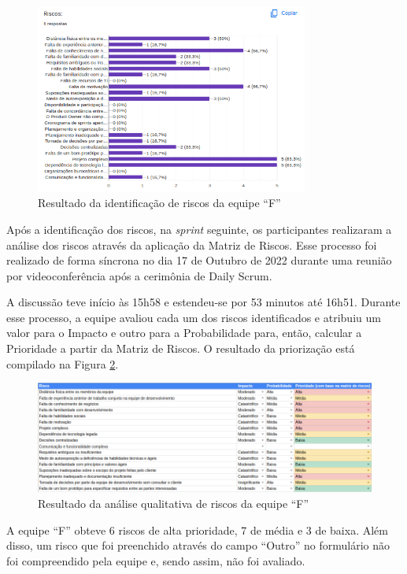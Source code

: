 \documentclass[
    12pt,       %
    openright,      %
    twoside,      %
    a4paper,      %
    english,      %
    french,       %
    spanish,      %
    brazil,       %
    ]{abntex2}
\begin{document}
\begin{figure}[H]
    \centering
    \includegraphics[width=0.8\textwidth]{src/tex/img/resultado-foundation.png}
    \caption{Resultado da identificação de riscos da equipe ``F''}
    \label{fig:result_found}
\end{figure}

Após a identificação dos riscos, na \textit{sprint} seguinte, os participantes realizaram a análise dos riscos através da aplicação da Matriz de Riscos. Esse processo foi realizado de forma síncrona no dia 17 de Outubro de 2022 durante uma reunião por videoconferência após a cerimônia de Daily Scrum. 

A discussão teve início às 15h58 e estendeu-se por 53 minutos até 16h51. Durante esse processo, a equipe avaliou cada um dos riscos identificados e atribuiu um valor para o Impacto e outro para a Probabilidade para, então, calcular a Prioridade a partir da Matriz de Riscos. O resultado da priorização está compilado na Figura \ref{fig:result_found}.

\begin{figure}[H]
    \centering
    \includegraphics[width=1\textwidth]{src/tex/img/riscos_founds.png}
    \caption{Resultado da análise qualitativa de riscos da equipe ``F''}
    \label{fig:result_found}
\end{figure}

A equipe ``F'' obteve 6 riscos de alta prioridade, 7 de média e 3 de baixa. Além disso, um risco que foi preenchido através do campo ``Outro'' no formulário não foi compreendido pela equipe e, sendo assim, não foi avaliado.
\end{document}
